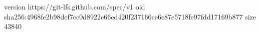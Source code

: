version https://git-lfs.github.com/spec/v1
oid sha256:4968fe2b98def7ec0d8922c66ed420f237166ce6e87e5718fe97fdd17169b877
size 43840

